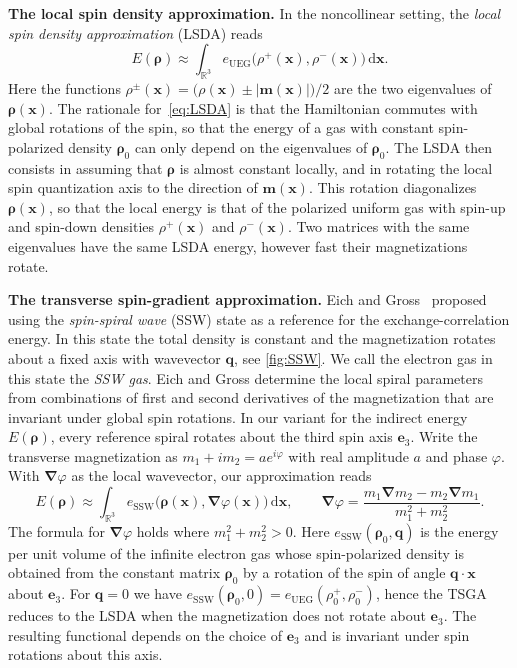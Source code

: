 \documentclass[final,reqno]{amsart}
\theoremstyle{remark}
\newcommand{\RR}{\mathbb{R}}
\newcommand{\UEG}{\mathrm{UEG}}
\newcommand{\SSW}{\mathrm{SSW}}
\newcommand{\grad}{\bm{\nabla}}
\newcommand{\dd}{\mathrm{d}}
\begin{document}
\noindent\textbf{The local spin density approximation.} In the noncollinear setting, the \emph{local spin density approximation} (LSDA) reads~\cite{von1972local,kubler1988density}
\begin{equation}\label{eq:LSDA}
 E(\bm{\rho})\approx\int_{\RR^3}e_\UEG\big(\rho^+(\mathbf{x}),\rho^-(\mathbf{x})\big)\,\dd \mathbf{x}.
\end{equation}
Here the functions $\rho^\pm(\mathbf{x})=\big(\rho(\mathbf{x})\pm|\mathbf{m}(\mathbf{x})|\big)/2$ are the two eigenvalues of $\bm{\rho}(\mathbf{x})$. The rationale for~\cref{eq:LSDA} is that the Hamiltonian commutes with global rotations of the spin, so that the energy of a gas with constant spin-polarized density $\bm{\rho}_0$ can only depend on the eigenvalues of $\bm{\rho}_0$. The LSDA then consists in assuming that $\bm{\rho}$ is almost constant locally, and in rotating the local spin quantization axis to the direction of $\mathbf{m}(\mathbf{x})$. This rotation diagonalizes $\bm{\rho}(\mathbf{x})$, so that the local energy is that of the polarized uniform gas with spin-up and spin-down densities $\rho^+(\mathbf{x})$ and $\rho^-(\mathbf{x})$. Two matrices with the same eigenvalues have the same LSDA energy, however fast their magnetizations rotate.

\medskip

\noindent\textbf{The transverse spin-gradient approximation.} Eich and Gross~\cite{eich2013transverse} proposed using the \emph{spin-spiral wave} (SSW) state as a reference for the exchange-correlation energy. In this state the total density is constant and the magnetization rotates about a fixed axis with wavevector $\mathbf{q}$, see \cref{fig:SSW}. We call the electron gas in this state the \emph{SSW gas}. Eich and Gross determine the local spiral parameters from combinations of first and second derivatives of the magnetization that are invariant under global spin rotations. In our variant for the indirect energy $E(\bm{\rho})$, every reference spiral rotates about the third spin axis $\mathbf{e}_3$. Write the transverse magnetization as $m_1+im_2=a e^{i\varphi}$ with real amplitude $a$ and phase $\varphi$. With $\grad\varphi$ as the local wavevector, our approximation reads
\begin{equation}\label{eq:TSGA}
 E(\bm{\rho})\approx\int_{\RR^3}e_\SSW\big(\bm{\rho}(\mathbf{x}),\grad\varphi(\mathbf{x})\big)\,\dd \mathbf{x},\qquad\grad\varphi=\frac{m_1\grad m_2-m_2\grad m_1}{m_1^2+m_2^2}.
\end{equation}
The formula for $\grad\varphi$ holds where $m_1^2+m_2^2>0$. Here $e_\SSW(\bm{\rho}_0,\mathbf{q})$ is the energy per unit volume of the infinite electron gas whose spin-polarized density is obtained from the constant matrix $\bm{\rho}_0$ by a rotation of the spin of angle $\mathbf{q}\cdot\mathbf{x}$ about $\mathbf{e}_3$. For $\mathbf{q}=0$ we have $e_\SSW(\bm{\rho}_0,0)=e_\UEG(\rho_0^+,\rho_0^-)$, hence the TSGA reduces to the LSDA when the magnetization does not rotate about $\mathbf{e}_3$. 
The resulting functional depends on the choice of $\mathbf{e}_3$ and is invariant under spin rotations about this axis.  
\end{document}
